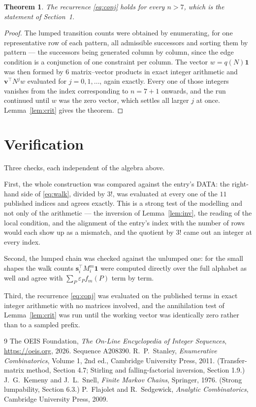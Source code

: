\documentclass[11pt,a4paper]{article}
\theoremstyle{plain}
\newtheorem{theorem}{Theorem}
\theoremstyle{definition}
\begin{document}
\begin{theorem}
The recurrence \eqref{eq:conj} holds for every $n>7$, which is the statement of
Section~1.
\end{theorem}

\begin{proof}
The lumped transition counts were obtained by enumerating, for one representative row of
each pattern, all admissible successors and sorting them by pattern --- the successors being
generated column by column, since the edge condition is a conjunction of one constraint per
column. The vector $w=q(N)\mathbf{1}$ was then formed by $6$ matrix--vector products
in exact integer arithmetic and $\mathbf{v}^{\!\top}N^{j}w$ evaluated for
$j=0,1,\dots$, again exactly. Every one of those integers vanishes from the index
corresponding to $n=7+1$ onwards, and the run continued until $w$ was the zero vector,
which settles all larger $j$ at once. Lemma~\ref{lem:crit} gives the theorem.
\end{proof}

\section{Verification}

Three checks, each independent of the algebra above.

First, the whole construction was compared against the entry's DATA: the right-hand side of
\eqref{eq:walk}, divided by $3!$, was evaluated at every one of the $11$
published indices and agrees exactly. This is a strong test of the modelling and not only of
the arithmetic --- the inversion of Lemma~\ref{lem:inv}, the reading of the local
condition, and the alignment of the entry's index with the number of rows would each
show up as a mismatch, and the quotient by $3!$ came out an integer at every index.

Second, the lumped chain was checked against the unlumped one: for the small shapes the walk
counts $\mathbf{s}_i^{\!\top}M_i^{m}\mathbf{1}$ were computed directly over the full
alphabet as well and agree with $\sum_P\varepsilon_Pf_m(P)$ term by term.

Third, the recurrence \eqref{eq:conj} was evaluated on the published terms in exact integer
arithmetic with no matrices involved, and the annihilation test of Lemma~\ref{lem:crit} was
run until the working vector was identically zero rather than to a sampled prefix.

\begin{thebibliography}{9}
 The OEIS Foundation, \emph{The On-Line Encyclopedia of Integer
Sequences}, \url{https://oeis.org}, 2026. Sequence A208390.
 R.~P.~Stanley, \emph{Enumerative Combinatorics}, Volume 1, 2nd ed.,
Cambridge University Press, 2011. (Transfer-matrix method, Section 4.7; Stirling and
falling-factorial inversion, Section 1.9.)
 J.~G.~Kemeny and J.~L.~Snell, \emph{Finite Markov Chains}, Springer,
1976. (Strong lumpability, Section 6.3.)
 P.~Flajolet and R.~Sedgewick, \emph{Analytic Combinatorics}, Cambridge
University Press, 2009.
\end{thebibliography}
\end{document}
